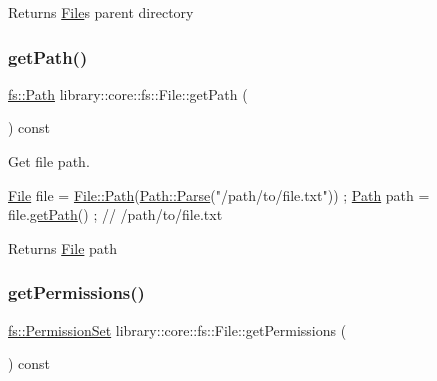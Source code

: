 \begin{DoxyReturn}{Returns}
\hyperlink{classlibrary_1_1core_1_1fs_1_1_file}{File}\textquotesingle{}s parent directory 
\end{DoxyReturn}
\mbox{\label{classlibrary_1_1core_1_1fs_1_1_file_a70b1380ff844adf37a481bbdb46d11a0}} 
\subsubsection{\texorpdfstring{get\+Path()}{getPath()}}
{\footnotesize\ttfamily \hyperlink{classlibrary_1_1core_1_1fs_1_1_path}{fs\+::\+Path} library\+::core\+::fs\+::\+File\+::get\+Path (\begin{DoxyParamCaption}{ }\end{DoxyParamCaption}) const}



Get file path. 


\begin{DoxyCode}
\hyperlink{classlibrary_1_1core_1_1fs_1_1_file_a7490060f19a21d4ee58bb6cec87a1ca6}{File} file = \hyperlink{classlibrary_1_1core_1_1fs_1_1_file_a0e0d8a8becb3cdd21775554e181452d8}{File::Path}(\hyperlink{classlibrary_1_1core_1_1fs_1_1_path_aebf5bd3af83e0b7376616e146f3e55df}{Path::Parse}(\textcolor{stringliteral}{"/path/to/file.txt"})) ;
\hyperlink{classlibrary_1_1core_1_1fs_1_1_file_a0e0d8a8becb3cdd21775554e181452d8}{Path} path = file.\hyperlink{classlibrary_1_1core_1_1fs_1_1_file_a70b1380ff844adf37a481bbdb46d11a0}{getPath}() ; \textcolor{comment}{// /path/to/file.txt}
\end{DoxyCode}


\begin{DoxyReturn}{Returns}
\hyperlink{classlibrary_1_1core_1_1fs_1_1_file}{File} path 
\end{DoxyReturn}
\mbox{\label{classlibrary_1_1core_1_1fs_1_1_file_a0addf18f7510955e48fdef2416b98423}} 
\subsubsection{\texorpdfstring{get\+Permissions()}{getPermissions()}}
{\footnotesize\ttfamily \hyperlink{classlibrary_1_1core_1_1fs_1_1_permission_set}{fs\+::\+Permission\+Set} library\+::core\+::fs\+::\+File\+::get\+Permissions (\begin{DoxyParamCaption}{ }\end{DoxyParamCaption}) const}



